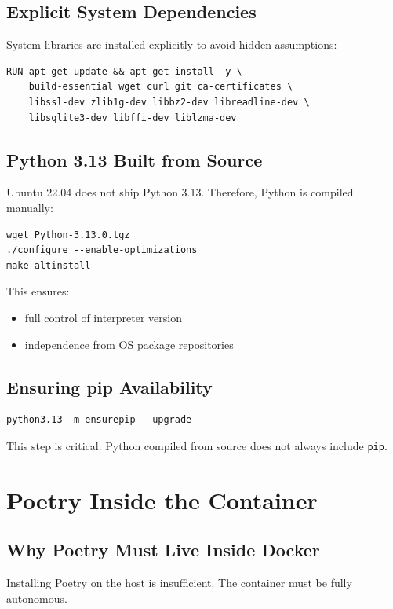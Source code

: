 \documentclass[11pt, a4paper]{article}
\begin{document}
\subsection{Explicit System Dependencies}
System libraries are installed explicitly to avoid hidden assumptions:
\begin{lstlisting}[language=docker]
RUN apt-get update && apt-get install -y \
    build-essential wget curl git ca-certificates \
    libssl-dev zlib1g-dev libbz2-dev libreadline-dev \
    libsqlite3-dev libffi-dev liblzma-dev
\end{lstlisting}

\subsection{Python 3.13 Built from Source}
Ubuntu 22.04 does not ship Python 3.13. Therefore, Python is compiled manually:
\begin{lstlisting}[language=docker]
wget Python-3.13.0.tgz
./configure --enable-optimizations
make altinstall
\end{lstlisting}

This ensures:
\begin{itemize}
    \item full control of interpreter version
    \item independence from OS package repositories
\end{itemize}

\subsection{Ensuring pip Availability}
\begin{lstlisting}[language=docker]
python3.13 -m ensurepip --upgrade
\end{lstlisting}

This step is critical: Python compiled from source does not always include \texttt{pip}.

\section{Poetry Inside the Container}

\subsection{Why Poetry Must Live Inside Docker}
Installing Poetry on the host is insufficient.
The container must be fully autonomous.
\end{document}
